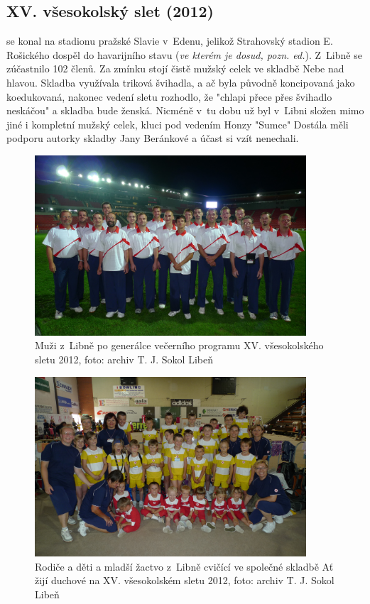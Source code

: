 \documentclass[a5paper, 11pt, twoside]{article}
\begin{document}
\clearpage
\subsection{XV. všesokolský slet (2012)} se konal na stadionu pražské Slavie
v~Edenu, jelikož Strahovský stadion E. Rošického dospěl do havarijního
stavu (\textit{ve kterém je dosud, pozn. ed.}). Z~Libně se zúčastnilo 102
členů. Za zmínku stojí čistě mužský celek ve skladbě Nebe nad hlavou.
Skladba využívala triková švihadla, a ač byla původně koncipovaná jako
koedukovaná, nakonec vedení sletu rozhodlo, že "chlapi přece přes
švihadlo neskáčou" a skladba bude ženská. Nicméně v~tu dobu už byl
v~Libni složen mimo jiné i kompletní mužský celek, kluci pod vedením Honzy
"Sumce" Dostála měli podporu autorky skladby Jany Beránkové a účast si
vzít nenechali.

\begin{figure}[h]
  \centering 
  \includegraphics[width=0.9\textwidth]{img/61_muzi_slet_12.JPG}
  \caption*{Muži z~Libně po generálce večerního programu XV. všesokolského
  sletu 2012, foto: archiv T. J. Sokol Libeň}
\end{figure}

\begin{figure}[h]
  \centering 
  \includegraphics[width=0.9\textwidth]{img/62_rd_duchove.JPG}
  \caption*{Rodiče a děti a mladší žactvo z~Libně cvičící ve společné skladbě
  Ať žijí duchové na XV. všesokolském sletu 2012, foto: archiv T. J. Sokol Libeň}
\end{figure}
\end{document}
